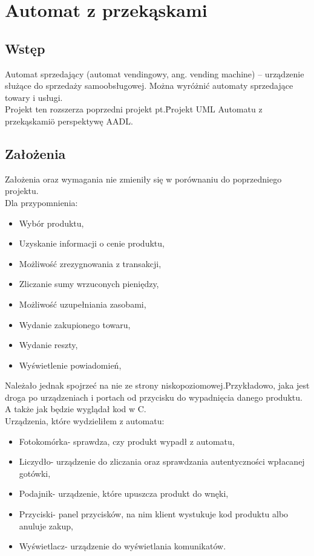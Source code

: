 \documentclass[a4paper, 11pt]{article}
\begin{document}
\section{Automat z przekąskami }

\subsection{Wstęp}
 Automat sprzedający (automat vendingowy, ang. vending machine) – urządzenie służące do sprzedaży samoobsługowej. Można wyróżnić automaty sprzedające towary i usługi.\\
Projekt ten rozszerza poprzedni projekt pt.\"Projekt UML Automatu z przekąskami\" o perspektywę AADL.\\

\subsection{Założenia}
Założenia oraz wymagania nie zmieniły się w porównaniu do poprzedniego projektu.\\
Dla przypomnienia:
\begin{itemize}
\item Wybór produktu,
\item Uzyskanie informacji o cenie produktu,
\item Możliwość zrezygnowania z transakcji,
\item Zliczanie sumy wrzuconych pieniędzy,
\item Możliwość uzupełniania zasobami,
\item Wydanie zakupionego towaru,
\item Wydanie reszty,
\item Wyświetlenie powiadomień,
\end{itemize}

Należało jednak spojrzeć na nie ze strony niskopoziomowej.Przykładowo, jaka jest droga po urządzeniach i portach od przycisku do wypadnięcia danego produktu. A także jak będzie wyglądał kod w C.\\

Urządzenia, które wydzieliłem z automatu:
\begin{itemize}
\item Fotokomórka- sprawdza, czy produkt wypadł z automatu,
\item Liczydło- urządzenie do zliczania oraz sprawdzania autentyczności wpłacanej gotówki,
\item Podajnik- urządzenie, które upuszcza produkt do wnęki,
\item Przyciski- panel przycisków, na nim klient wystukuje kod produktu albo anuluje zakup,
\item Wyświetlacz- urządzenie do wyświetlania komunikatów.
\end{itemize}
 
\end{document}
